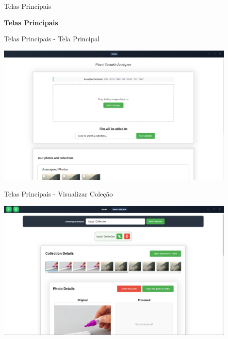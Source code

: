 \documentclass[landscape, 12pt]{beamer}
\begin{document}
\begin{frame}{Telas Principais}
    \begin{center}
        \textbf{Telas Principais}
    \end{center}
\end{frame}

\begin{frame}{Telas Principais - Tela Principal}
    \begin{center}
        \includegraphics[width=0.9\textwidth]{../figures/hci/home_page.png}
    \end{center}
\end{frame}

\begin{frame}{Telas Principais - Visualizar Coleção}
    \begin{center}
        \includegraphics[width=0.9\textwidth]{../figures/hci/view_collection.png}
    \end{center}
\end{frame}
\end{document}
